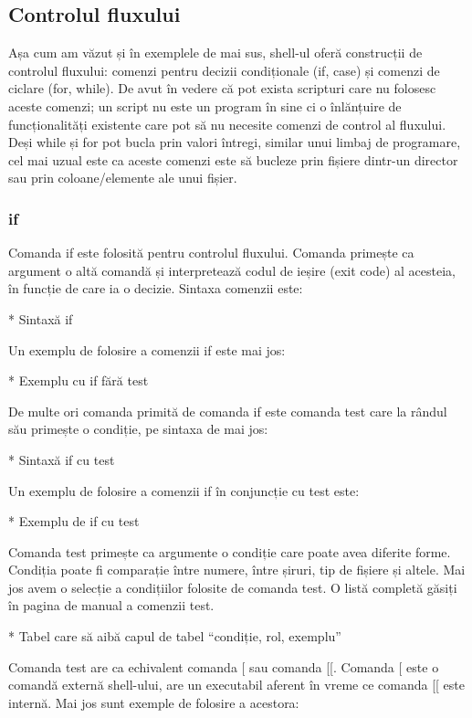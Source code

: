 \subsection{Controlul fluxului}
\label{sec:auto-func-flux}

Așa cum am văzut și în exemplele de mai sus, shell-ul oferă construcții de
controlul fluxului: comenzi pentru decizii condiționale (if, case) și comenzi de
ciclare (for, while). De avut în vedere că pot exista scripturi care nu folosesc
aceste comenzi; un script nu este un program în sine ci o înlănțuire de
funcționalități existente care pot să nu necesite comenzi de control al
fluxului. Deși while și for pot bucla prin valori întregi, similar unui limbaj
de programare, cel mai uzual este ca aceste comenzi este să bucleze prin fișiere
dintr-un director sau prin coloane/elemente ale unui fișier.

\subsubsection{if}
\label{sec:auto-func-flux-if}

Comanda if este folosită pentru controlul fluxului. Comanda primește ca argument
o altă comandă și interpretează codul de ieșire (exit code) al acesteia, în
funcție de care ia o decizie. Sintaxa comenzii este:

* Sintaxă if

Un exemplu de folosire a comenzii if este mai jos:

* Exemplu cu if fără test

De multe ori comanda primită de comanda if este comanda test care la rândul său
primește o condiție, pe sintaxa de mai jos:

* Sintaxă if cu test

Un exemplu de folosire a comenzii if în conjuncție cu test este:

* Exemplu de if cu test

Comanda test primește ca argumente o condiție care poate avea diferite forme.
Condiția poate fi comparație între numere, între șiruri, tip de fișiere și
altele. Mai jos avem o selecție a condițiilor folosite de comanda test. O listă
completă găsiți în pagina de manual a comenzii test.

* Tabel care să aibă capul de tabel “condiție, rol, exemplu”

Comanda test are ca echivalent comanda [ sau comanda [[. Comanda [ este o
comandă externă shell-ului, are un executabil aferent în vreme ce comanda [[
este internă. Mai jos sunt exemple de folosire a acestora:

